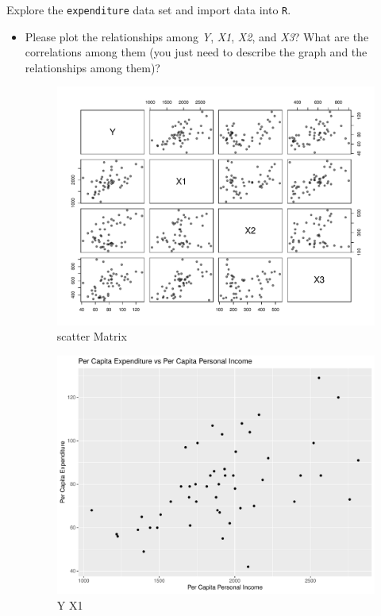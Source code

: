 \documentclass[12pt,letterpaper]{article}
\begin{document}
\vspace{.5cm}
\noindent Explore the \texttt{expenditure} data set and import data into \texttt{R}.
\begin{itemize}
\item
Please plot the relationships among \emph{Y}, \emph{X1}, \emph{X2}, and \emph{X3}? What are the correlations among them (you just need to describe the graph and the relationships among them)?
  

\begin{figure}[h!]\centering
	\caption{\footnotesize scatter Matrix}
	\label{fig:1}
	\includegraphics[width=.75\textwidth]{scatter_Matrix.pdf}
\end{figure}

 \begin{figure}[h!]\centering
	\caption{\footnotesize Y X1}
	\label{fig:3}
	\includegraphics[width=.75\textwidth]{Y_vs_X1.pdf}
\end{figure}


\end{itemize}
\end{document}

